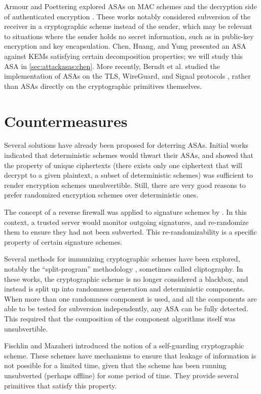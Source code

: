 Armour and Poettering explored ASAs on MAC schemes and the decryption side of authenticated encryption \cite{ToSC:ArmPoe19,IMA:ArmPoe19}. These works notably considered subversion of the receiver in a cryptographic scheme instead of the sender, which may be relevant to situations where the sender holds no secret information, such as in public-key encryption and key encapsulation. Chen, Huang, and Yung \cite{AC:CheHuaYun20} presented an ASA against KEMs satisfying certain decomposition properties; we will study this ASA in \autoref{sec:attackasas:chen}. More recently, Berndt et al. studied the implementation of ASAs on the TLS, WireGuard, and Signal protocols \cite{EPRINT:BWPTE20}, rather than ASAs directly on the cryptographic primitives themselves.

\section{Countermeasures}

Several solutions have already been proposed for deterring ASAs. Initial works \cite{C:BelPatRog14,FSE:DegFarPoe15,CCS:BelJaeKan15} indicated that deterministic schemes would thwart their ASAs, and showed that the property of unique ciphertexts (there exists only one ciphertext that will decrypt to a given plaintext, a subset of deterministic schemes) was sufficient to render encryption schemes unsubvertible. Still, there are very good reasons to prefer randomized encryption schemes over deterministic ones.

The concept of a reverse firewall was applied to signature schemes by \cite{CCS:AteMagVen15}. In this context, a trusted server would monitor outgoing signatures, and re-randomize them to ensure they had not been subverted. This re-randomizability is a specific property of certain signature schemes.

Several methods for immunizing cryptographic schemes have been explored, notably the ``split-program'' methodology \cite{CCS:RTYZ17,AC:RTYZ16,CCS:TanYun17}, sometimes called cliptography. In these works, the cryptographic scheme is no longer considered a blackbox, and instead is split up into randomness generation and deterministic components. When more than one randomness component is used, and all the components are able to be tested for subversion independently, any ASA can be fully detected. This required that the composition of the component algorithms itself was unsubvertible.

Fischlin and Mazaheri \cite{CSF:FisMaz18} introduced the notion of a self-guarding cryptographic scheme. These schemes have mechanisms to ensure that leakage of information is not possible for a limited time, given that the scheme has been running unsubverted (perhaps offline) for some period of time. They provide several primitives that satisfy this property.

